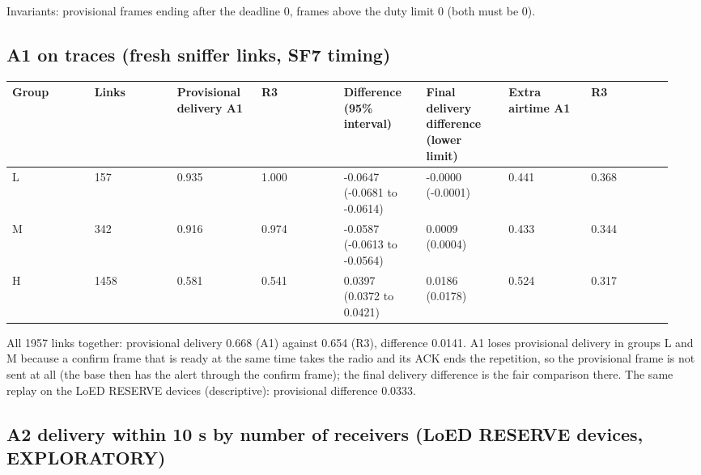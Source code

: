 Invariants: provisional frames ending after the deadline 0, frames above the duty limit 0 (both must be 0).

\subsection*{A1 on traces (fresh sniffer links, SF7 timing)}

{\scriptsize\raggedright
\begin{longtable}{p{0.119\linewidth}p{0.119\linewidth}p{0.119\linewidth}p{0.119\linewidth}p{0.119\linewidth}p{0.119\linewidth}p{0.119\linewidth}p{0.119\linewidth}}
\toprule
Group & Links & Provisional delivery A1 & R3 & Difference (95\% interval) & Final delivery difference (lower limit) & Extra airtime A1 & R3 \\
\midrule
\endhead
L & 157 & 0.935 & 1.000 & -0.0647 (-0.0681 to -0.0614) & -0.0000 (-0.0001) & 0.441 & 0.368 \\
M & 342 & 0.916 & 0.974 & -0.0587 (-0.0613 to -0.0564) & 0.0009 (0.0004) & 0.433 & 0.344 \\
H & 1458 & 0.581 & 0.541 & 0.0397 (0.0372 to 0.0421) & 0.0186 (0.0178) & 0.524 & 0.317 \\
\bottomrule
\end{longtable}}

All 1957 links together: provisional delivery 0.668 (A1) against 0.654 (R3), difference 0.0141. A1 loses provisional delivery in groups L and M because a confirm frame that is ready at the same time takes the radio and its ACK ends the repetition, so the provisional frame is not sent at all (the base then has the alert through the confirm frame); the final delivery difference is the fair comparison there.
The same replay on the LoED RESERVE devices (descriptive): provisional difference 0.0333.

\subsection*{A2 delivery within 10 s by number of receivers (LoED RESERVE devices, EXPLORATORY)}

